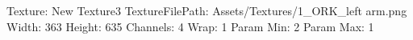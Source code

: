 Texture: New Texture3
TextureFilePath: Assets/Textures/1_ORK_left arm.png
Width: 363
Height: 635
Channels: 4
Wrap: 1
Param Min: 2
Param Max: 1